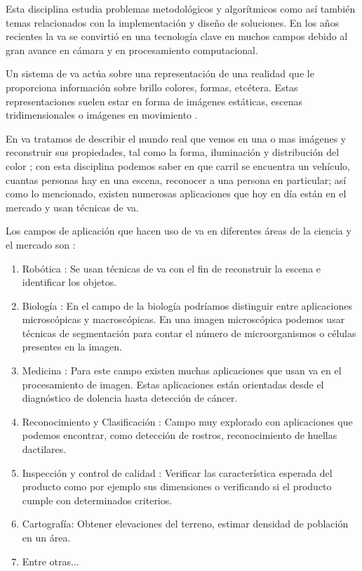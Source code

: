 \begin{center}
\begin{minipage}{0.7\linewidth}  \vspace{5pt}{\small La visión por computadora tiene como objetivo el uso de cámaras para analizar o entender escenas en el mundo real.}
\begin{flushright}
  \citep{Reinhard}
\end{flushright}
\vspace{5pt}
\end{minipage}
\end{center}

Esta disciplina estudia problemas metodológicos y algorítmicos como así también temas relacionados con la implementación y diseño de soluciones. En los años recientes la \ac{va} se convirtió en una tecnología clave en muchos campos debido al gran avance en cámara y en procesamiento computacional.

Un sistema de \ac{va} actúa sobre una representación de una realidad que le proporciona información sobre brillo colores, formas, etcétera. Estas representaciones suelen estar en forma de imágenes estáticas, escenas tridimensionales o imágenes en movimiento \citep{Ledda}. 

En \ac{va} tratamos de describir el mundo real que vemos en una o mas imágenes y reconstruir sus propiedades, tal como la forma, iluminación y distribución del color \citep{Szeliski}; con esta disciplina podemos saber en que carril se encuentra un vehículo, cuantas personas hay en una escena, reconocer a una persona en particular; así como lo mencionado, existen numerosas aplicaciones que hoy en día están en el mercado  y usan técnicas de \ac{va}. 

Los campos de aplicación que hacen uso de \ac{va} en diferentes áreas de la ciencia y el mercado son \citep{areascv} :
\begin{enumerate}
\item Robótica : Se usan técnicas de \ac{va} con el fin de reconstruir la escena e identificar los objetos.
\item Biología : En el campo de la biología podríamos distinguir entre aplicaciones microscópicas y macroscópicas. En una imagen microscópica  podemos  usar técnicas de segmentación para contar el número de microorganismos o células presentes en la imagen.
\item Medicina : Para este campo existen muchas aplicaciones que usan \ac{va} en el procesamiento de imagen. Estas aplicaciones están orientadas desde el diagnóstico de dolencia hasta detección de cáncer. 
\item  Reconocimiento y Clasificación : Campo muy explorado con aplicaciones que podemos encontrar, como detección de rostros, reconocimiento de huellas dactilares.
\item Inspección y control de calidad : Verificar las característica esperada del producto como por ejemplo sus dimensiones o verificando si el producto cumple con determinados criterios.
\item  Cartografía: Obtener elevaciones del terreno, estimar densidad de población en un área.
\item Entre otras...
\end{enumerate}


